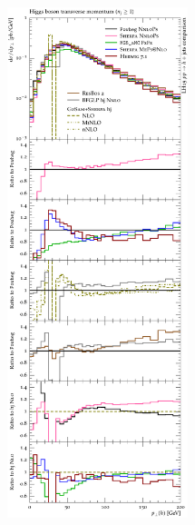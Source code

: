 \begin{figure}[p!]
  \centering
  \includegraphics[width=0.47\textwidth]{figures/hjetscomp_u_H_j_pT_incl.pdf}
  \hfill

\end{figure}

